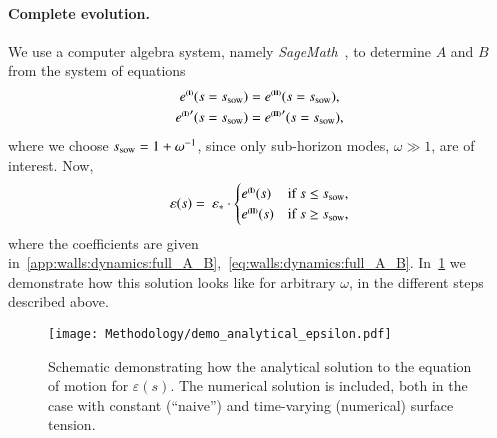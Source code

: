     \paragraph{Complete evolution.} %
    We use a computer algebra system, namely \textit{SageMath}~\citep{sagemath}, to determine $A$ and $B$ from the system of equations
    \begin{equation}
        \begin{split}
            e^{\text{{\tiny{\textbf{(I)}}}}}(s=s_\mathrm{sow}) &= e^{\text{{\tiny{\textbf{(II)}}}}}(s=s_\mathrm{sow}), \\
            {e^{\text{{\tiny{\textbf{(I)}}}}}}'(s=s_\mathrm{sow}) &= {e^{\text{{\tiny{\textbf{(II)}}}}}}'(s=s_\mathrm{sow}),
        \end{split}
    \end{equation}
    where we choose $s_\mathrm{sow}=1+\omega^{-1}$, since only sub-horizon modes, $\omega\gg 1$, are of interest. Now,
    \begin{equation}\label{eq:pertwalls:mywalls:eps_s_complete_MD}
        \varepsilon(s) =  \epsast \cdot \begin{cases}
            e^{\text{\eqregimenum{I}}} (s)  &\text{if } s \leq s\ped{sow}, \\
            e^{\text{\eqregimenum{II}}}(s)  &\text{if }  s \geq s\ped{sow},
        \end{cases}
    \end{equation}
    where the coefficients are given in~\cref{app:walls:dynamics:full_A_B},~\cref{eq:walls:dynamics:full_A_B}. %
    In~\cref{fig:pertwalls:mywalls:demo_analytical_epsilon} we demonstrate how this solution looks like for arbitrary $\omega$, in the different steps described above. %
    \begin{figure}[h]
        \centering
        \texttt{[image: Methodology/demo\_analytical\_epsilon.pdf]}
        \caption{Schematic demonstrating how the analytical solution to the equation of motion for $\varepsilon(s)$. The numerical solution is included, both in the case with constant (``naive'') and time-varying (numerical) surface tension.}  
        \label{fig:pertwalls:mywalls:demo_analytical_epsilon}
    \end{figure}

